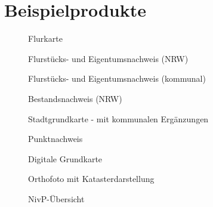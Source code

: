 \chapter{Beispielprodukte}
\begin{figure}[htbp]
	\centering
	\caption*{Flurkarte}
	\label{fig:flurkarte}
\end{figure}
\begin{figure}[htbp]
	\centering
	\caption*{Flurstücks- und Eigentumsnachweis (NRW)}
	\label{fig:eigentumsnachweis_nrw}
\end{figure}
\begin{figure}[htbp]
	\centering
	\caption*{Flurstücks- und Eigentumsnachweis (kommunal)}
	\label{fig:eigentumsnachweis_kom}
\end{figure}
\begin{figure}[htbp]
	\centering
	\caption*{Bestandsnachweis (NRW)}
	\label{fig:bestandsnachweis_nrw}
\end{figure}
\begin{figure}[htbp]
	\centering
	\caption*{Stadtgrundkarte - mit kommunalen Ergänzungen}
	\label{fig:stadtgrundkarte}
\end{figure}
\begin{figure}[htbp]
	\centering
	\caption*{Punktnachweis}
	\label{fig:punktnachweis}
\end{figure}
\begin{figure}[htbp]
	\centering
	\caption*{Digitale Grundkarte}
	\label{fig:digitale_grundkarte}
\end{figure}
\begin{figure}[htbp]
	\centering
	\caption*{Orthofoto mit Katasterdarstellung}
	\label{fig:orthofoto-katasterdarstellung}
\end{figure}
\begin{figure}[htbp]
	\centering
	\caption*{NivP-Übersicht}
	\label{fig:nivp-uebersicht}
\end{figure}
